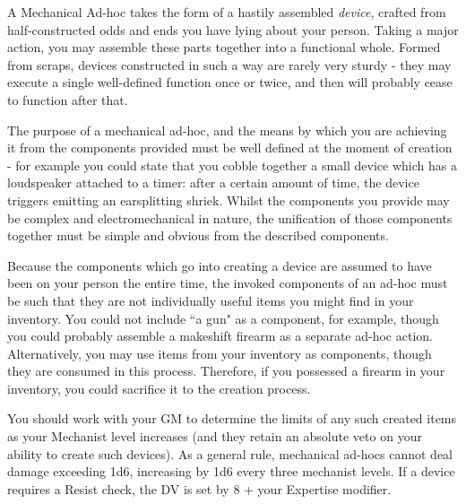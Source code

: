 {
	A Mechanical Ad-hoc takes the form of a hastily assembled {\it device}, crafted from half-constructed odds and ends you have lying about your person. Taking a major action, you may assemble these parts together into a functional whole. Formed from scraps, devices constructed in such a way are rarely very sturdy - they may execute a single well-defined function once or twice, and then will probably cease to function after that. 
	
	The purpose of a mechanical ad-hoc, and the means by which you are achieving it from the components provided must be well defined at the moment of creation - for example you could state that you cobble together a small device which has a loudspeaker attached to a timer: after a certain amount of time, the device triggers emitting an earsplitting shriek. Whilst the components you provide may be complex and electromechanical in nature, the unification of those components together must be simple and obvious from the described components.
	
	Because the components which go into creating a device are assumed to have been on your person the entire time, the invoked components of an ad-hoc must be such that they are not individually useful items you might find in your inventory. You could not include ``a gun" as a component, for example, though you could probably assemble a makeshift firearm as a separate ad-hoc action. Alternatively, you may use items from your inventory as components, though they are consumed in this process. Therefore, if you possessed a firearm in your inventory, you could sacrifice it to the creation process. 
	
	You should work with your GM to determine the limits of any such created items as your Mechanist level increases (and they retain an absolute veto on your ability to create such devices). As a general rule, mechanical ad-hocs cannot deal damage exceeding 1d6, increasing by 1d6 every three mechanist levels. If a device requires a Resist check, the DV is set by 8 + your Expertise modifier. 
	
}

